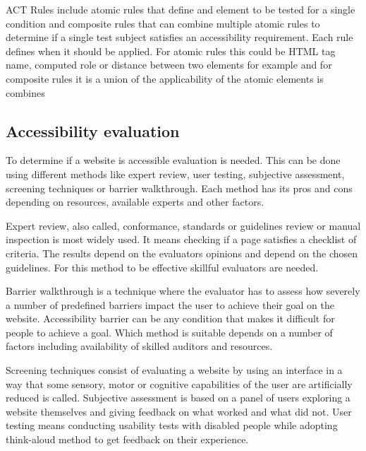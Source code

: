 \documentclass{master_thesis}
\begin{document}
ACT Rules include atomic rules that define and element to be tested for a single condition and composite rules that can combine multiple atomic rules to determine if a single test subject satisfies an accessibility requirement. Each rule defines when it should be applied. For atomic rules this could be HTML tag name, computed role or distance between two elements for example and for composite rules it is a union of the applicability of the atomic elements is combines  \citep{Fiers2019}

\subsection{Accessibility evaluation}


To determine if a website is accessible evaluation is needed. This can be done using different methods like expert review, user testing, subjective assessment, screening techniques or barrier walkthrough. Each method has its pros and cons depending on resources, available experts and other factors.

Expert review, also called, conformance, standards or guidelines review or manual inspection is most widely used. It means checking if a page satisfies a checklist of criteria. The results depend on the evaluators opinions and depend on the chosen guidelines. For this method to be effective skillful evaluators are needed. \citep{Brajnik2008}

Barrier walkthrough is a technique where the evaluator has to assess how severely a number of predefined barriers impact the user to achieve their goal on the website. Accessibility barrier can be any condition that makes it difficult for people to achieve a goal. Which method is suitable depends on a number of factors including availability of skilled auditors and resources. \citep{Brajnik2008}

Screening techniques consist of evaluating a website by using an interface in a way that some sensory, motor or cognitive capabilities of the user are artificially reduced is called. Subjective assessment is based on a panel of users exploring a website themselves and giving feedback on what worked and what did not. User testing means conducting usability tests with disabled people while adopting think-aloud method to get feedback on their experience. \citep{Brajnik2008}
\end{document}
